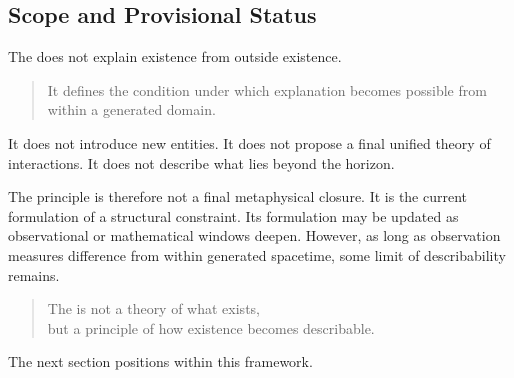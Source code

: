 \subsection*{Scope and Provisional Status}

The \DHP{} does not explain existence from outside existence.

\medskip
\begin{quote}
It defines the condition under which explanation becomes possible
from within a generated domain.
\end{quote}
\medskip

It does not introduce new entities.
It does not propose a final unified theory of interactions.
It does not describe what lies beyond the horizon.

The principle is therefore not a final metaphysical closure.
It is the current formulation of a structural constraint.
Its formulation may be updated as observational or mathematical
windows deepen.
However,
as long as observation measures difference from within generated
spacetime,
some limit of describability remains.

\medskip
\begin{quote}
The \DHP{} is not a theory of what exists,\\
but a principle of how existence becomes describable.
\end{quote}
\medskip

The next section positions \VED{} within this framework.
